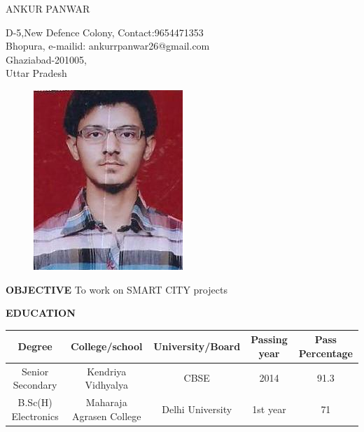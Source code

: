 \documentclass{article}
\begin{document}
\begin{center}
	{
		\large{ANKUR PANWAR}
	}
\end{center}
\begin{flushleft}
D-5,New Defence Colony, \hspace{3.6in} Contact:9654471353\\
Bhopura, \hspace{3.5in} e-mailid: ankurrpanwar26@gmail.com\\
Ghaziabad-201005,\\
Uttar Pradesh\\
\end{flushleft}
\vspace{-0.3in}
\begin{figure}[h]
\hspace{4.4in}
	\includegraphics{img.jpg}
\end{figure}

\begin{flushleft}
	\textbf{OBJECTIVE}
	\vspace{-0.20in}
	\hspace{.5in}
	To work on SMART CITY projects
\end{flushleft}

\begin{flushleft}
	\vspace{0.30in}
	\textbf{EDUCATION}
	\hspace{0.45in}
	\begin{tabular}{|c|c|c|c|c|}
	\hline
	Degree&College/school&University/Board&Passing year&Pass Percentage\\
	\hline
	Senior Secondary&Kendriya Vidhyalya&CBSE&2014&91.3\\
	\hline
	B.Sc(H) Electronics&Maharaja Agrasen College&Delhi University&1st year&71%
	
	\end{tabular}
\end{flushleft}
\end{document}
